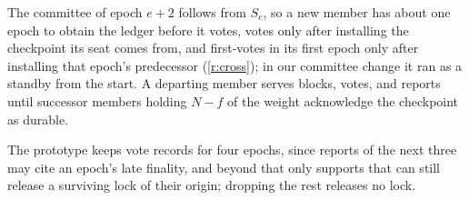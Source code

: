 The committee of epoch $e+2$ follows from $S_e$, so a new member has about one epoch to obtain the ledger before it votes, votes only after installing the checkpoint its seat comes from, and first-votes in its first epoch only after installing that epoch's predecessor (\ref{r:cross}); in our committee change it ran as a standby from the start. A departing member serves blocks, votes, and reports until successor members holding $N-f$ of the weight acknowledge the checkpoint as durable.

The prototype keeps vote records for four epochs, since reports of the next three may cite an epoch's late finality, and beyond that only supports that can still release a surviving lock of their origin; dropping the rest releases no lock.
